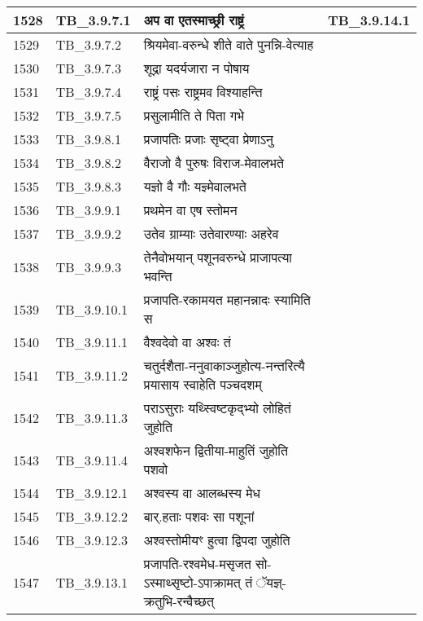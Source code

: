 \documentclass[17pt]{extarticle}
\begin{document}
\begin{longtable}{||p{0.4in}||p{0.9in}||p{4.0in}||p{0.9in}||}
        \hline
            1528 & TB\_3.9.7.1 & अप वा एतस्माच्छ्री राष्ट्रं &  TB\_3.9.14.1       \\
        \hline
            1529 & TB\_3.9.7.2 & श्रियमेवा{-}वरुन्धे शीते वाते पुनन्नि{-}वेत्याह &      \\
        \hline
            1530 & TB\_3.9.7.3 & शूद्रा यदर्यजारा न पोषाय &      \\
        \hline
            1531 & TB\_3.9.7.4 & राष्ट्रं पसः राष्ट्रमव विश्याहन्ति &      \\
        \hline
            1532 & TB\_3.9.7.5 & प्रसुलामीति ते पिता गभे &      \\
        \hline
            1533 & TB\_3.9.8.1 & प्रजापतिः प्रजाः सृष्ट्वा प्रेणाऽनु &      \\
        \hline
            1534 & TB\_3.9.8.2 & वैराजो वै पुरुषः विराज{-}मेवालभते &      \\
        \hline
            1535 & TB\_3.9.8.3 & यज्ञो वै गौः यज्ञ्मेवालभते &      \\
        \hline
            1536 & TB\_3.9.9.1 & प्रथमेन वा एष स्तोमन &      \\
        \hline
            1537 & TB\_3.9.9.2 & उतेव ग्राम्याः उतेवारण्याः अहरेव &      \\
        \hline
            1538 & TB\_3.9.9.3 & तेनैवोभयान् पशूनवरुन्धे प्राजापत्या भवन्ति &      \\
        \hline
            1539 & TB\_3.9.10.1 & प्रजापति{-}रकामयत महानन्नादः स्यामिति स &      \\
        \hline
            1540 & TB\_3.9.11.1 & वैश्वदेवो वा अश्वः तं &      \\
        \hline
            1541 & TB\_3.9.11.2 & चतुर्दशैता{-}ननुवाकाञ्जुहोत्य{-}नन्तरित्यै प्रयासाय स्वाहेति पञ्चदशम् &      \\
        \hline
            1542 & TB\_3.9.11.3 & पराऽसुराः यथ्स्विष्टकृद्भ्यो लोहितं जुहोति &      \\
        \hline
            1543 & TB\_3.9.11.4 & अश्वशफेन द्वितीया{-}माहुतिं जुहोति पशवो &      \\
        \hline
            1544 & TB\_3.9.12.1 & अश्वस्य वा आलब्धस्य मेध &      \\
        \hline
            1545 & TB\_3.9.12.2 & बार्.हताः पशवः सा पशूनां &      \\
        \hline
            1546 & TB\_3.9.12.3 & अश्वस्तोमीयꣳ हुत्वा द्विपदा जुहोति &      \\
        \hline
            1547 & TB\_3.9.13.1 & प्रजापति{-}रश्वमेध{-}मसृजत सो{-}ऽस्माथ्सृष्टो{-}ऽपाक्रामत् तं ॅयज्ञ्{-}क्रतुभि{-}रन्वैच्छत् &      \\

\end{longtable}
\end{document}

